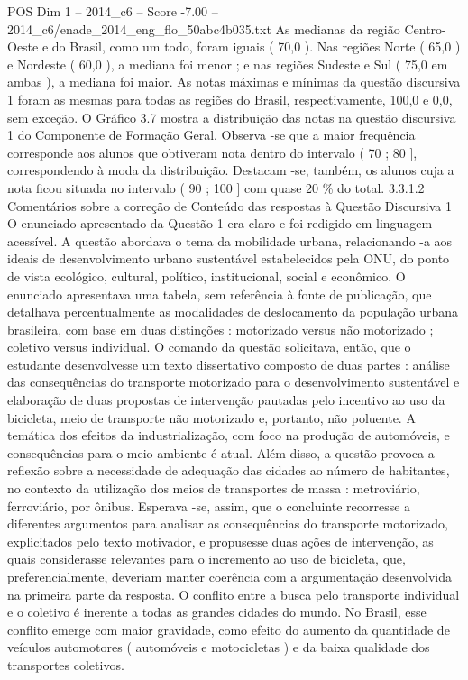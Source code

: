 \begin{textsample}{POS Dim 1 – 2014\_c6 – Score -7.00 – 2014\_c6/enade\_2014\_eng\_flo\_50abc4b035.txt}
As medianas da região Centro-Oeste e do Brasil, como um todo, foram iguais ( 70,0 ).
Nas regiões Norte ( 65,0 ) e Nordeste ( 60,0 ), a mediana foi menor ; e nas regiões Sudeste e Sul ( 75,0 em ambas ), a mediana foi maior.
As notas máximas e mínimas da questão discursiva 1 foram as mesmas para todas as regiões do Brasil, respectivamente, 100,0 e 0,0, sem exceção.
O Gráfico 3.7 mostra a distribuição das notas na questão discursiva 1 do Componente de Formação Geral.
Observa -se que a maior frequência corresponde aos alunos que obtiveram nota dentro do intervalo ( 70 ; 80 ], correspondendo à moda da distribuição.
Destacam -se, também, os alunos cuja a nota ficou situada no intervalo ( 90 ; 100 ] com quase 20 \% do total. 3.3.1.2 Comentários sobre a correção de Conteúdo das respostas à Questão Discursiva 1 O enunciado apresentado da Questão 1 era claro e foi redigido em linguagem acessível.
A questão abordava o tema da mobilidade urbana, relacionando -a aos ideais de desenvolvimento urbano sustentável estabelecidos pela ONU, do ponto de vista ecológico, cultural, político, institucional, social e econômico.
O enunciado apresentava uma tabela, sem referência à fonte de publicação, que detalhava percentualmente as modalidades de deslocamento da população urbana brasileira, com base em duas distinções : motorizado versus não motorizado ; coletivo versus individual.
O comando da questão solicitava, então, que o estudante desenvolvesse um texto dissertativo composto de duas partes : análise das consequências do transporte motorizado para o desenvolvimento sustentável e elaboração de duas propostas de intervenção pautadas pelo incentivo ao uso da bicicleta, meio de transporte não motorizado e, portanto, não poluente.
A temática dos efeitos da industrialização, com foco na produção de automóveis, e consequências para o meio ambiente é atual.
Além disso, a questão provoca a reflexão sobre a necessidade de adequação das cidades ao número de habitantes, no contexto da utilização dos meios de transportes de massa : metroviário, ferroviário, por ônibus.
Esperava -se, assim, que o concluinte recorresse a diferentes argumentos para analisar as consequências do transporte motorizado, explicitados pelo texto motivador, e propusesse duas ações de intervenção, as quais considerasse relevantes para o incremento ao uso de bicicleta, que, preferencialmente, deveriam manter coerência com a argumentação desenvolvida na primeira parte da resposta.
O conflito entre a busca pelo transporte individual e o coletivo é inerente a todas as grandes cidades do mundo.
No Brasil, esse conflito emerge com maior gravidade, como efeito do aumento da quantidade de veículos automotores ( automóveis e motocicletas ) e da baixa qualidade dos transportes coletivos.

\end{textsample}
